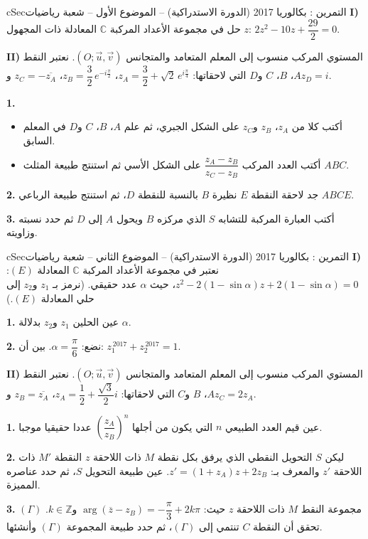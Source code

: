 \documentclass[12pt,a4paper]{article}
\newenvironment{BOX}[2]{\begin{otherlanguage}{english}\begin{arbox}{#1}{#2}}{\end{arbox}\end{otherlanguage}}
\newcounter{exo}
\newenvironment{tamrin}[1]{\stepcounter{exo}\begin{BOX}{cSec}{التمرين \theexo: #1}}{\end{BOX}}
\newenvironment{sq}{\begin{itemize}[leftmargin=2.4em,itemsep=3pt]}{\end{itemize}}
\newcommand{\qa}{\item[(أ)]}\newcommand{\qb}{\item[(ب)]}\newcommand{\qc}{\item[(جـ)]}\newcommand{\qd}{\item[(د)]}\newcommand{\qe}{\item[(هـ)]}
\newcommand{\QQ}[1]{\par\smallskip\textbf{#1.} }
\begin{document}
\begin{tamrin}{بكالوريا 2017 (الدورة الاستدراكية) -- الموضوع الأول -- شعبة رياضيات}
\textbf{I)} حل في مجموعة الأعداد المركبة $\mathbb{C}$ المعادلة ذات المجهول $z$: $2z^2-10z+\dfrac{29}{2}=0$.

\textbf{II)} المستوي المركب منسوب إلى المعلم المتعامد والمتجانس $\left(O;\vec u,\vec v\right)$.
نعتبر النقط $A$، $B$، $C$ و$D$ التي لاحقاتها: $z_A=\dfrac32+\sqrt2\,e^{i\frac{\pi}{4}}$، $z_B=\dfrac32\,e^{-i\frac{\pi}{2}}$، $z_C=-\overline{z_A}$ و$z_D=i$.

\QQ{1}
\begin{sq}
\qa أكتب كلا من $z_A$، $z_B$ و$z_C$ على الشكل الجبري، ثم علم $A$، $B$، $C$ و$D$ في المعلم السابق.
\qb أكتب العدد المركب $\dfrac{z_A-z_B}{z_C-z_B}$ على الشكل الأسي ثم استنتج طبيعة المثلث $ABC$.
\end{sq}
\QQ{2} جد لاحقة النقطة $E$ نظيرة $B$ بالنسبة للنقطة $D$، ثم استنتج طبيعة الرباعي $ABCE$.

\QQ{3} أكتب العبارة المركبة للتشابه $S$ الذي مركزه $B$ ويحول $A$ إلى $D$ ثم حدد نسبته وزاويته.

\end{tamrin}

\begin{tamrin}{بكالوريا 2017 (الدورة الاستدراكية) -- الموضوع الثاني -- شعبة رياضيات}
\textbf{I)} نعتبر في مجموعة الأعداد المركبة $\mathbb{C}$ المعادلة $(E)$: $z^2-2(1-\sin\alpha)z+2(1-\sin\alpha)=0$، حيث $\alpha$ عدد حقيقي.
(نرمز بـ $z_1$ و$z_2$ إلى حلي المعادلة $(E)$.)

\QQ{1} عين الحلين $z_1$ و$z_2$ بدلالة $\alpha$.

\QQ{2} نضع: $\alpha=\dfrac{\pi}{6}$. بين أن: $z_1^{\,2017}+z_2^{\,2017}=1$.

\textbf{II)} المستوي المركب منسوب إلى المعلم المتعامد والمتجانس $\left(O;\vec u,\vec v\right)$.
نعتبر النقط $A$، $B$ و$C$ التي لاحقاتها: $z_A=\dfrac12+\dfrac{\sqrt3}{2}i$، $z_B=\overline{z_A}$ و$z_C=2z_A$.

\QQ{1} عين قيم العدد الطبيعي $n$ التي يكون من أجلها $\left(\dfrac{z_A}{z_B}\right)^n$ عددا حقيقيا موجبا.

\QQ{2} ليكن $S$ التحويل النقطي الذي يرفق بكل نقطة $M$ ذات اللاحقة $z$ النقطة $M'$ ذات اللاحقة $z'$ والمعرف بـ: $z'=\left(1+z_A\right)z+2z_B$.
عين طبيعة التحويل $S$، ثم حدد عناصره المميزة.

\QQ{3} $(\Gamma)$ مجموعة النقط $M$ ذات اللاحقة $z$ حيث: $\arg\left(\overline{z}-z_B\right)=-\dfrac{\pi}{3}+2k\pi$ و$k\in\mathbb{Z}$.
تحقق أن النقطة $C$ تنتمي إلى $(\Gamma)$، ثم حدد طبيعة المجموعة $(\Gamma)$ وأنشئها.
\end{tamrin}
\end{document}
